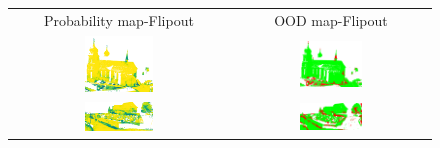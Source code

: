         \begin{figure}[h!]
            \centering
            \begin{tabular}{cc}
                Probability map-Flipout & OOD map-Flipout \\
                \includegraphics[width=0.33\textwidth, height=0.18\textheight]{images/ood_imgs/fout_sem3d/fout_prob_1.png}& 
                \includegraphics[width=0.33\textwidth, height=0.18\textheight]{images/ood_imgs/fout_sem3d/fout_ood_auroc_1.png}\\

                \includegraphics[width=0.33\textwidth, height=0.18\textheight]{images/ood_imgs/fout_sem3d/fout_prob_2.png}& 
                \includegraphics[width=0.33\textwidth, height=0.18\textheight]{images/ood_imgs/fout_sem3d/fout_ood_auroc_2.png}\\
    

\end{tabular}
\end{figure}
